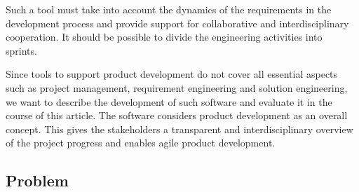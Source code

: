     Such a tool must take into account the dynamics of the requirements in the development process and provide support for collaborative and interdisciplinary cooperation. It should be possible to divide the engineering activities into sprints.~\cite{liu2012scenario}

    Since tools to support product development do not cover all essential aspects such as project management, requirement engineering and solution engineering, we want to describe the development of such software and evaluate it in the course of this article. The software considers product development as an overall concept. This gives the stakeholders a transparent and interdisciplinary overview of the project progress and enables agile product development.
    






    \subsection*{Problem}

